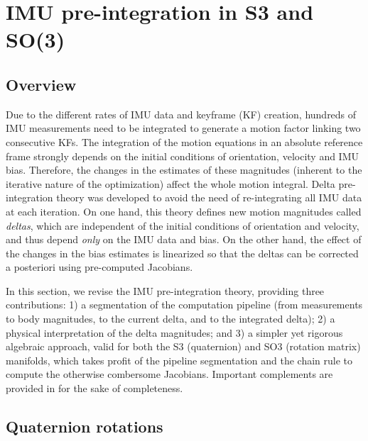 




\section{IMU pre-integration in S3 and SO(3)}
\label{sec:imu}

\subsection{Overview}

Due to the different rates of IMU data and keyframe (KF) creation, hundreds of IMU measurements need to be integrated to generate a motion factor linking two consecutive KFs. 
The integration of the motion equations in an absolute reference frame strongly depends on the initial conditions of orientation, velocity and IMU bias.
Therefore, the changes in the estimates of these magnitudes (inherent to the iterative nature of the optimization) affect the whole motion integral. 
Delta pre-integration theory was developed \cite{LUPTON-09,forster2015imu} to avoid the need of re-integrating all IMU data at each iteration. 
On one hand, this theory defines new motion magnitudes called \emph{deltas}, which are independent of the initial conditions of orientation and velocity, and thus depend \emph{only} on the IMU data and bias. 
On the other hand, the effect of the changes in the bias estimates is linearized so that the deltas can be corrected a posteriori using pre-computed Jacobians. 

In this section, we revise the IMU pre-integration theory, providing three contributions: 
1) a segmentation of the computation pipeline (from measurements to body magnitudes, to the current delta, and to the integrated delta); 
2) a physical interpretation of the delta magnitudes; 
and 
3) a simpler yet rigorous algebraic approach, valid for both the S3 (quaternion) and SO3 (rotation matrix) manifolds, which takes profit of the pipeline segmentation and the chain rule to compute the otherwise combersome \cite{forster2015imu} Jacobians. 
Important complements are provided in  for the sake of completeness.

\subsection{Quaternion rotations}


